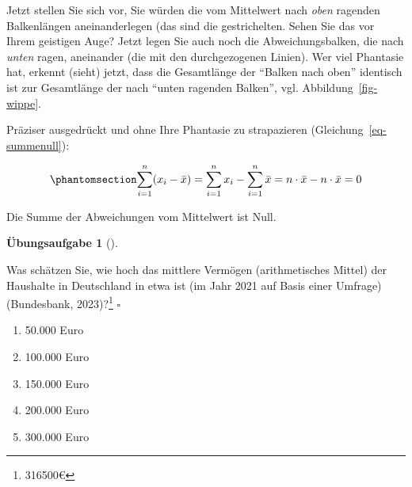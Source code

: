 \documentclass[
  letterpaper,
]{scrbook}
\providecommand{\tightlist}{%
  \setlength{\itemsep}{0pt}\setlength{\parskip}{0pt}}\usepackage{longtable,booktabs,array}
\theoremstyle{definition}
\theoremstyle{definition}
\theoremstyle{definition}
\newtheorem{exercise}{Übungsaufgabe}[chapter]
\theoremstyle{remark}
\begin{document}
Jetzt stellen Sie sich vor, Sie würden die vom Mittelwert nach
\emph{oben} ragenden Balkenlängen aneinanderlegen (das sind die
gestrichelten. Sehen Sie das vor Ihrem geistigen Auge? Jetzt legen Sie
auch noch die Abweichungsbalken, die nach \emph{unten} ragen, aneinander
(die mit den durchgezogenen Linien). Wer viel Phantasie hat, erkennt
(sieht) jetzt, dass die Gesamtlänge der ``Balken nach oben'' identisch
ist zur Gesamtlänge der nach ``unten ragenden Balken'', vgl.
Abbildung~\ref{fig-wippe}.

Präziser ausgedrückt und ohne Ihre Phantasie zu strapazieren
(Gleichung~\ref{eq-summenull}):

\begin{equation}\phantomsection\label{eq-summenull}{\sum_{i=1}^n (x_i-\bar{x})=\sum_{i=1}^n x_i - \sum_{i=1}^n \bar{x} = n\cdot \bar{x} - n\cdot \bar{x}=0}\end{equation}

\begin{tcolorbox}[enhanced jigsaw, colbacktitle=quarto-callout-note-color!10!white, coltitle=black, bottomrule=.15mm, rightrule=.15mm, arc=.35mm, toptitle=1mm, colframe=quarto-callout-note-color-frame, opacitybacktitle=0.6, left=2mm, leftrule=.75mm, breakable, opacityback=0, bottomtitle=1mm, titlerule=0mm, title=\textcolor{quarto-callout-note-color}{\faInfo}\hspace{0.5em}{Hinweis}, colback=white, toprule=.15mm]

Die Summe der Abweichungen vom Mittelwert ist Null.

\end{tcolorbox}

\begin{exercise}[]\protect\hypertarget{exr-mw-wealth1}{}\label{exr-mw-wealth1}

Was schätzen Sie, wie hoch das mittlere Vermögen (arithmetisches Mittel)
der Haushalte in Deutschland in etwa ist (im Jahr 2021 auf Basis einer
Umfrage) (Bundesbank, 2023)?\footnote{316500€} \(\square\)

\begin{enumerate}
\def\labelenumi{\alph{enumi})}
\tightlist
\item
  50.000 Euro
\item
  100.000 Euro
\item
  150.000 Euro
\item
  200.000 Euro
\item
  300.000 Euro
\end{enumerate}

\end{exercise}
\end{document}
